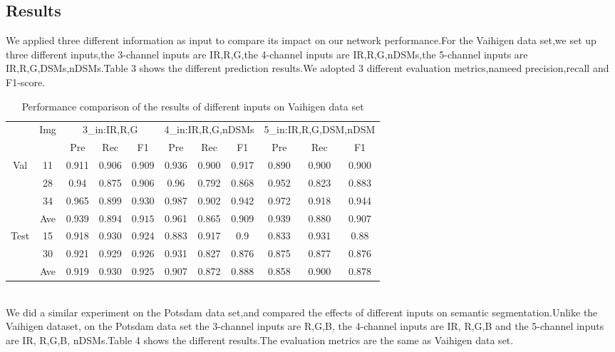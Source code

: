 \documentclass{article}
\begin{document}
\subsection {Results}
We applied three different information as input to compare its impact on our network performance.For the Vaihigen data set,we set up three different inputs,the 3-channel inputs are IR,R,G,the 4-channel inputs are IR,R,G,nDSMs,the 5-channel inputs are IR,R,G,DSMs,nDSMs.Table 3 shows the different prediction results.We adopted 3 different evaluation metrics,nameed precision,recall and F1-score.
\begin{table}[h!b!p]
\caption {Performance comparison of the results of different inputs on Vaihigen data set}
\begin{center}
\begin{tabular}{c|c|c|c|c|c|c|c|c|c|c}
\hline
&\multirow{2}{*}{Img}&\multicolumn{3}{c}{3\_in:IR,R,G} &\multicolumn{3}{|c|}{4\_in:IR,R,G,nDSMs}&\multicolumn{3}{c}{5\_in:IR,R,G,DSM,nDSM}\\
\cline{3-11}
&& Pre &Rec & F1 &Pre &Rec &F1&Pre &Rec &F1\\
\hline
\multirow{3}{*}{Val}&11&0.911&0.906&0.909&0.936&0.900&0.917&0.890&0.900&0.900\\
&28&0.94&0.875&0.906&0.96&0.792&0.868&0.952&0.823&0.883\\
&34&0.965&0.899&0.930&0.987&0.902&0.942&0.972&0.918&0.944\\
&Ave&0.939&0.894&$\bm{0.915}$&0.961&0.865&0.909&0.939&0.880&0.907\\
\hline
\multirow{2}{*}{Test}&15&0.918&0.930&0.924&0.883&0.917&0.9&0.833&0.931&0.88\\
&30&0.921&0.929&0.926&0.931&0.827&0.876&0.875&0.877&0.876\\
&Ave&0.919&0.930&$\bm{0.925}$&0.907&0.872&0.888&0.858&0.900&0.878\\
\hline
\end{tabular}
\end{center}
\end{table}
\\We did a similar experiment on the Potsdam data set,and compared the effects of different inputs on semantic segmentation.Unlike the Vaihigen dataset, on the Potsdam data set the 3-channel inputs are R,G,B, the 4-channel inputs are IR, R,G,B and the 5-channel inputs are IR, R,G,B, nDSMs.Table 4 shows the different results.The evaluation metrics are the same as Vaihigen data set.
\end{document}
